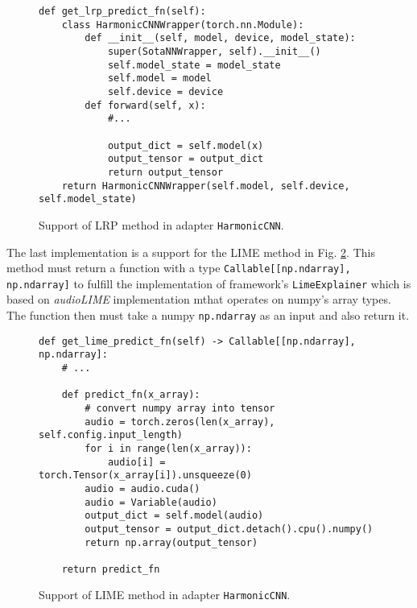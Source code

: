 \documentclass[
    bindingoffset=5mm,  %
    footnoteindent=3mm, %
    hyphenation=true    %
]{src/wut-thesis}
\begin{document}
\begin{figure}%
\begin{verbatim}
def get_lrp_predict_fn(self):
    class HarmonicCNNWrapper(torch.nn.Module):
        def __init__(self, model, device, model_state):
            super(SotaNNWrapper, self).__init__()
            self.model_state = model_state
            self.model = model 
            self.device = device
        def forward(self, x):
            #...

            output_dict = self.model(x)
            output_tensor = output_dict
            return output_tensor
    return HarmonicCNNWrapper(self.model, self.device, self.model_state)
\end{verbatim}
\caption{Support of LRP method in adapter \texttt{HarmonicCNN}.}
\label{fig:HarmonicLrpOverload}
\end{figure}

The last implementation is a support for the LIME method in Fig. \ref{fig:HarmonicLLIMEOverload}.
This method must return a function with a type \texttt{Callable[[np.ndarray], np.ndarray]}
to fulfill the implementation of framework’s \texttt{LimeExplainer} which is based on \textit{audioLIME}
implementation mthat operates on numpy’s array types. The function then must
take a numpy \texttt{np.ndarray} as an input and also return it.

\begin{figure}[h!]
\begin{verbatim}
def get_lime_predict_fn(self) -> Callable[[np.ndarray], np.ndarray]:
    # ...

    def predict_fn(x_array):
        # convert numpy array into tensor
        audio = torch.zeros(len(x_array), self.config.input_length)
        for i in range(len(x_array)):
            audio[i] = torch.Tensor(x_array[i]).unsqueeze(0)
        audio = audio.cuda()
        audio = Variable(audio)
        output_dict = self.model(audio)
        output_tensor = output_dict.detach().cpu().numpy()
        return np.array(output_tensor)

    return predict_fn
\end{verbatim}
\caption{Support of LIME method in adapter \texttt{HarmonicCNN}.}
\label{fig:HarmonicLLIMEOverload}
\end{figure}

\end{document}
